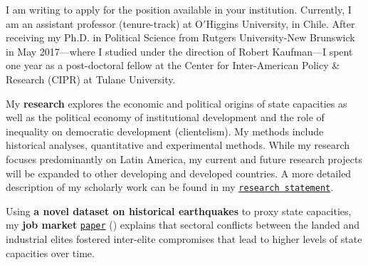 \vspace{-0.3cm}I am writing to apply for the position available in your institution. Currently, I am an assistant professor (tenure-track) at O$'$Higgins University, in Chile. After receiving my Ph.D. in Political Science from Rutgers University-New Brunswick in May 2017---where I studied under the direction of Robert Kaufman---I spent one year as a post-doctoral fellow at the Center for Inter-American Policy \& Research (CIPR) at Tulane University. 

My {\bf research} explores the economic and political origins of state capacities as well as the political economy of institutional development and the role of inequality on democratic development (clientelism). My methods include historical analyses, quantitative and experimental methods. While my research focuses predominantly on Latin America, my current and future research projects will be expanded to other developing and developed countries. A more detailed description of my scholarly work can be found in my \href{http://github.com/hbahamonde/Job_Market/raw/master/Bahamonde_Research_Statement.pdf}{\texttt{research statement}}.


Using {\bf a novel dataset on historical earthquakes} to proxy state capacities, my {\bf job market} \href{https://github.com/hbahamonde/Earthquake_Paper/raw/master/Bahamonde_Earthquake_Paper.pdf}{\texttt{paper}} (\emph{\unskip}) explains that sectoral conflicts between the landed and industrial elites fostered inter-elite compromises that lead to higher levels of state capacities over time. 

